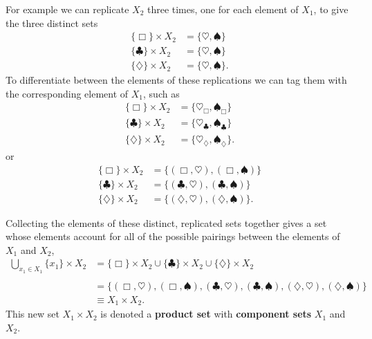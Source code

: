 \documentclass[
  letterpaper,
  DIV=11,
  numbers=noendperiod]{scrartcl}
\begin{document}
For example we can replicate \(X_{2}\) three times, one for each element
of \(X_{1}\), to give the three distinct sets \begin{align*}
\{ \Box \} \times X_{2} &= \{ \heartsuit, \spadesuit \}
\\
\{ \clubsuit \} \times X_{2} &= \{ \heartsuit, \spadesuit \}
\\
\{ \diamondsuit \} \times X_{2} &= \{ \heartsuit, \spadesuit \}.
\end{align*} To differentiate between the elements of these replications
we can tag them with the corresponding element of \(X_{1}\), such as
\begin{align*}
\{ \Box \} \times X_{2}
&= \{ \heartsuit_{\Box}, \spadesuit_{\Box} \}
\\
\{ \clubsuit \} \times X_{2}
&= \{ \heartsuit_{\clubsuit}, \spadesuit_{\clubsuit} \}
\\
\{ \diamondsuit \} \times X_{2}
&= \{ \heartsuit_{\diamondsuit}, \spadesuit_{\diamondsuit} \}.
\end{align*} or \begin{align*}
\{ \Box \} \times X_{2}
&= \{ (\Box, \heartsuit), (\Box, \spadesuit) \}
\\
\{ \clubsuit \} \times X_{2}
&= \{ (\clubsuit, \heartsuit), (\clubsuit, \spadesuit) \}
\\
\{ \diamondsuit \} \times X_{2}
&= \{ (\diamondsuit, \heartsuit), (\diamondsuit, \spadesuit) \}.
\end{align*}

Collecting the elements of these distinct, replicated sets together
gives a set whose elements account for all of the possible pairings
between the elements of \(X_{1}\) and \(X_{2}\), \begin{align*}
\bigcup_{x_{1} \in X_{1}} \{ x_{1} \} \times X_{2}
&=
\{ \Box \} \times X_{2} \cup
\{ \clubsuit \} \times X_{2} \cup
\{ \diamondsuit \} \times X_{2}
\\
\\
&=
\{ (\Box, \heartsuit), (\Box, \spadesuit),
(\clubsuit, \heartsuit), (\clubsuit, \spadesuit),
(\diamondsuit, \heartsuit), (\diamondsuit, \spadesuit) \}
\\
&\equiv
X_{1} \times X_{2}.
\end{align*} This new set \(X_{1} \times X_{2}\) is denoted a
\textbf{product set} with \textbf{component sets} \(X_{1}\) and
\(X_{2}\).
\end{document}
